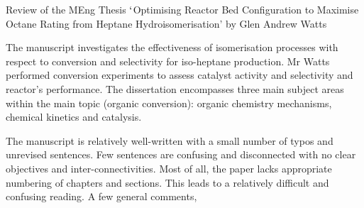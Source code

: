 \documentclass[14pt,twoside]{report}
\begin{document}
\clearpage






\vfill

\clearpage







\bigskip

\begin{center}
  {\Large Review of the MEng Thesis $\lq$Optimising Reactor Bed Configuration to Maximise Octane Rating from Heptane Hydroisomerisation' by Glen Andrew Watts}
\end{center}

The manuscript investigates the effectiveness of isomerisation processes with respect to conversion and selectivity for iso-heptane production. Mr Watts performed conversion experiments to assess catalyst activity and selectivity and reactor's performance. The dissertation encompasses three main subject areas within the main topic (organic conversion): organic chemistry mechanisms, chemical kinetics and catalysis.

The manuscript is relatively well-written with a small number of typos and unrevised sentences. Few sentences are confusing and disconnected with no clear objectives and inter-connectivities. Most of all, the paper lacks appropriate numbering of chapters and sections. This leads to a relatively difficult and confusing reading. A few general comments,
\end{document}
